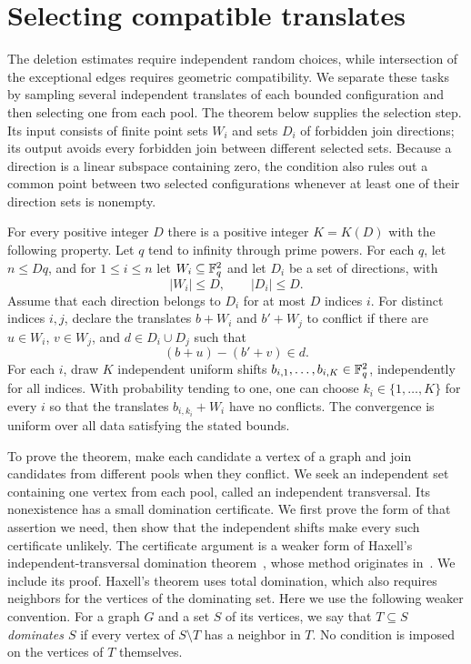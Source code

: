 \section{Selecting compatible translates}\label{sec:selection}

The deletion estimates require independent random choices, while
intersection of the exceptional edges requires geometric compatibility.
We separate these tasks by sampling several independent translates of
each bounded configuration and then selecting one from each pool.
The theorem below supplies the selection step. Its input consists of
finite point sets $W_i$ and sets $D_i$ of forbidden join directions;
its output avoids every forbidden join between different selected sets.
Because a direction is a linear subspace containing zero, the condition
also rules out a common point between two selected configurations
whenever at least one of their direction sets is nonempty.

\begin{theorem}\label{thm:selection}
For every positive integer $D$ there is a positive integer $K=K(D)$
with the following property.  Let $q$ tend to infinity through prime
powers.  For each $q$, let $n\le Dq$, and for $1\le i\le n$ let
$W_i\subseteq\mathbb F_q^2$ and let $D_i$ be a set of directions, with
\[
 |W_i|\le D,\qquad |D_i|\le D.
\]
Assume that each direction belongs to $D_i$ for at most $D$ indices $i$.
For distinct indices $i,j$, declare the translates $b+W_i$ and
$b'+W_j$ to conflict if there are $u\in W_i$, $v\in W_j$, and
$d\in D_i\cup D_j$ such that
\[
 (b+u)-(b'+v)\in d.
\]
For each $i$, draw $K$ independent uniform shifts
$b_{i,1},\ldots,b_{i,K}\in\mathbb F_q^2$, independently for all indices.
With probability tending to one, one can choose $k_i\in\{1,\ldots,K\}$
for every $i$ so that the translates $b_{i,k_i}+W_i$ have no conflicts.
The convergence is uniform over all data satisfying the stated bounds.
\end{theorem}

To prove the theorem, make each candidate a vertex of a graph and
join candidates from different pools when they conflict. We seek an
independent set containing one vertex from each pool, called an
independent transversal. Its nonexistence has a small domination
certificate. We first prove the form of that assertion we need, then
show that the independent shifts make every such certificate unlikely.
The certificate argument is a weaker form of Haxell's
independent-transversal domination theorem~\cite{Haxell2001},
whose method originates in~\cite{Haxell1995}. We include its proof.
Haxell's theorem uses total domination, which also requires neighbors
for the vertices of the dominating set. Here we use the following
weaker convention.
For a graph $G$ and a set $S$ of its vertices, we say that $T\subseteq S$
\emph{dominates $S$} if every vertex of $S\setminus T$ has a neighbor in
$T$.  No condition is imposed on the vertices of $T$ themselves.

